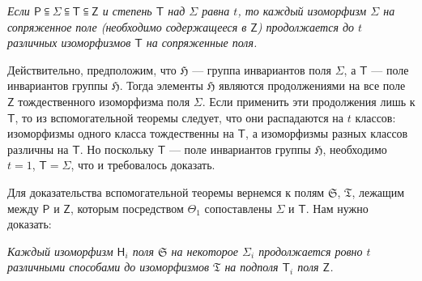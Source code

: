\documentclass[11pt]{article}
\begin{document}
\emph{Если \(\mathsf P \subseteqq \Sigma \subseteqq \mathsf T \subseteqq \mathsf Z\) и степень \(\mathsf T\) над \(\Sigma\) равна \(t\), то каждый изоморфизм \(\Sigma\) на сопряженное поле (необходимо содержащееся в \(\mathsf Z\)) продолжается до \(t\) различных изоморфизмов \(\mathsf T\) на сопряженные поля.}

Действительно, предположим, что \(\mathfrak H\) --- группа инвариантов поля \(\Sigma\), а \(\mathsf T\) --- поле инвариантов группы \(\mathfrak H\). Тогда элементы \(\mathfrak H\) являются продолжениями на все поле \(\mathsf Z\) тождественного изоморфизма поля \(\Sigma\). Если применить эти продолжения лишь к \(\mathsf T\), то из вспомогательной теоремы следует, что они распадаются на \(t\) классов: изоморфизмы одного класса тождественны на \(\mathsf T\), а изоморфизмы разных классов различны на \(\mathsf T\). Но поскольку \(\mathsf T\) --- поле инвариантов группы \(\mathfrak H\), необходимо \(t=1\), \(\mathsf T=\Sigma\), что и требовалось доказать.

Для доказательства вспомогательной теоремы вернемся к полям \(\mathfrak S\), \(\mathfrak T\), лежащим между \(\mathsf P\) и \(\mathsf Z\), которым посредством \(\Theta_1\) сопоставлены \(\Sigma\) и \(\mathsf T\). Нам нужно доказать:

\emph{Каждый изоморфизм \(\mathsf{H}_i\) поля \(\mathfrak S\) на некоторое \(\Sigma_i\) продолжается ровно \(t\) различными способами до изоморфизмов \(\mathfrak T\) на подполя \(\mathsf T_i\) поля \(\mathsf Z\).}
\end{document}
